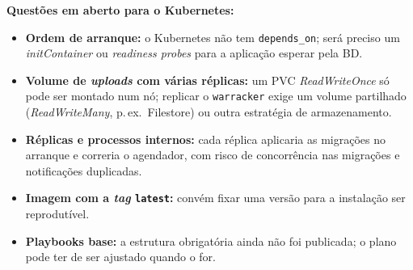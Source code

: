 \documentclass[11pt,a4paper]{article}
\newcommand{\code}[1]{\texttt{#1}}
\begin{document}
\textbf{Questões em aberto para o Kubernetes:}
\begin{itemize}
  \item \textbf{Ordem de arranque:} o Kubernetes não tem \code{depends\_on}; será preciso um
  \emph{initContainer} ou \emph{readiness probes} para a aplicação esperar pela BD.
  \item \textbf{Volume de \emph{uploads} com várias réplicas:} um PVC \emph{ReadWriteOnce} só pode ser
  montado num nó; replicar o \code{warracker} exige um volume partilhado (\emph{ReadWriteMany},
  p.\,ex.\ Filestore) ou outra estratégia de armazenamento.
  \item \textbf{Réplicas e processos internos:} cada réplica aplicaria as migrações no arranque e
  correria o agendador, com risco de concorrência nas migrações e notificações duplicadas.
  \item \textbf{Imagem com a \emph{tag} \code{latest}:} convém fixar uma versão para a instalação ser
  reprodutível.
  \item \textbf{Playbooks base:} a estrutura obrigatória ainda não foi publicada; o plano pode ter de
  ser ajustado quando o for.
\end{itemize}
\end{document}
